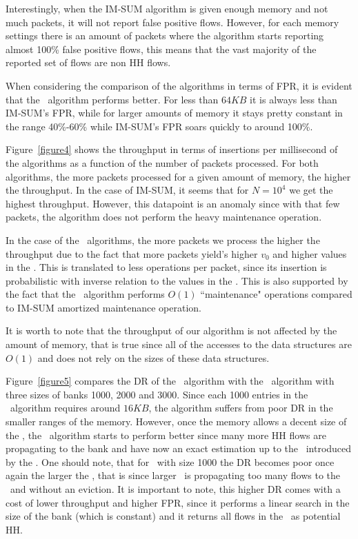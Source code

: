 Interestingly, when the IM-SUM algorithm is given enough memory and not much packets, it will not report false positive flows. However, for each memory settings there is an amount of packets where the algorithm starts reporting almost 100\% false positive flows, this means that the vast majority of the reported set of flows are non HH flows.

When considering the comparison of the algorithms in terms of FPR, it is evident that the \cs\ algorithm performs better. For less than $64KB$ it is always less than IM-SUM's FPR, while for larger amounts of memory it stays pretty constant in the range 40\%-60\% while IM-SUM's FPR soars quickly to around 100\%.

Figure~\ref{figure4} shows the throughput in terms of insertions per millisecond of the algorithms as a function of the number of packets processed. For both algorithms, the more packets processed for a given amount of memory, the higher the throughput. In the case of IM-SUM, it seems that for $N=10^4$ we get the highest throughput. However, this datapoint is an anomaly since with that few packets, the algorithm does not perform the heavy maintenance operation.

In the case of the \cs\ algorithms, the more packets we process the higher the throughput due to the fact that more packets yield's higher $v_0$ and higher values in the \sea. This is translated to less operations per packet, since its insertion is probabilistic with inverse relation to the values in the \sea. This is also supported by the fact that the \cs\ algorithm performs $O(1)$ ``maintenance" operations compared to IM-SUM amortized maintenance operation.

It is worth to note that the throughput of our algorithm is not affected by the amount of memory, that is true since all of the accesses to the data structures are $O(1)$ and does not rely on the sizes of these data structures.



Figure~\ref{figure5} compares the DR of the \cs\ algorithm with the \eb\ algorithm with three sizes of banks 1000, 2000 and 3000. Since each 1000 entries in the \eb\ algorithm requires around $16KB$, the algorithm suffers from poor DR in the smaller ranges of the memory. However, once the memory allows a decent size of the \sfa, the \eb\ algorithm starts to perform better since many more HH flows are propagating to the bank and have now an exact estimation up to the \pe\ introduced by the \sfa. One should note, that for \eb\ with size 1000 the DR becomes poor once again the larger the \sfa, that is since larger \sfa\ is propagating too many flows to the \eb\ and without an eviction. It is important to note, this higher DR comes with a cost of lower throughput and higher FPR, since it performs a linear search in the size of the bank (which is constant) and it returns all flows in the \eb\ as potential HH.

